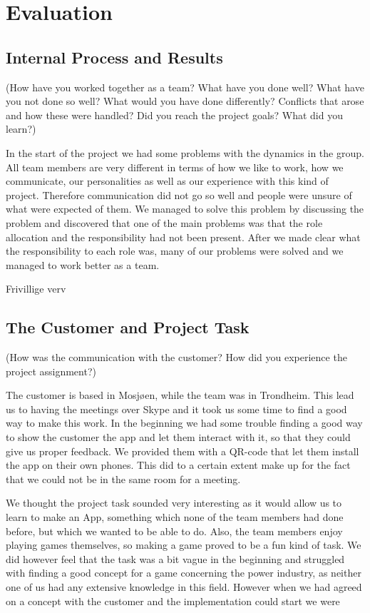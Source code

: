\section{Evaluation}


\subsection{Internal Process and Results}

	(How have you worked together as a team? What have you done 
	well? What have you not done so well? What would you have done differently? Conflicts that 
	arose and how these were handled? Did you reach the project goals? What did you learn?)

	In the start of the project we had some problems with the dynamics in the group. All team members are very different in terms of how we like to work, how we communicate, our personalities as well as our experience with this kind of project. Therefore communication did not go so well and people were unsure of what were expected of them. We managed to solve this problem by discussing the problem and discovered that one of the main problems was that the role allocation and the responsibility had not been present. After we made clear what the responsibility to each role was, many of our problems were solved and we managed to work better as a team.

	Frivillige verv


\subsection{The Customer and Project Task}

	(How was the communication with the customer? How did you experience the project assignment?)

	The customer is based in Mosjøen, while the team was in Trondheim. This lead us to having the 
	meetings over Skype and it took us some time to find a good way to make this work. In the beginning 
	we had some trouble finding a good way to show the customer the app and let them interact with it, 
	so that they could give us proper feedback. We provided them with a QR-code that let them install 
	the app on their own phones. This did to a certain extent make up for the fact that we could not 
	be in the same room for a meeting.

	We thought the project task sounded very interesting as it would allow us to learn to make an App, 
	something which none of the team members had done before, but which we wanted to be able to do. Also, 
	the team members enjoy playing games themselves, so making a game proved to be a fun kind of task. 
	We did however feel that the task was a bit vague in the beginning and struggled with finding a good 
	concept for a game concerning the power industry, as neither one of us had any extensive knowledge 
	in this field. However when we had agreed on a concept with the customer and the implementation could 
	start we were


